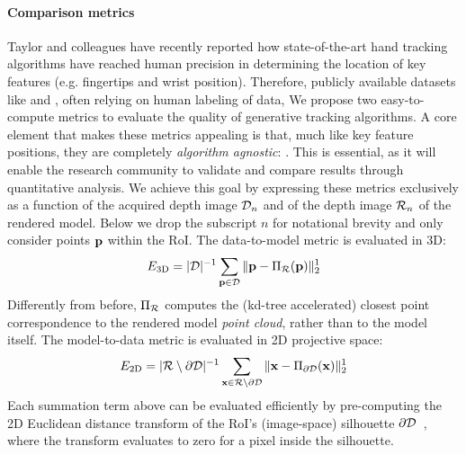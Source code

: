 
\paragraph{Comparison metrics}
Taylor and colleagues  have recently reported how state-of-the-art hand tracking algorithms have reached human precision in determining the location of key features (e.g. fingertips and wrist position). 
Therefore, publicly available datasets like \cite{tompson2014real} and \cite{sridhar2013multicam}, often relying on human labeling of data, 
% 
We propose two easy-to-compute metrics to evaluate the quality of generative tracking algorithms. A core element that makes these metrics appealing is that, much like key feature positions, they are completely \emph{algorithm agnostic}: . This is essential, as it will enable the research community to validate and compare results through quantitative analysis. 
% 
We achieve this goal by expressing these metrics exclusively as a function of the acquired depth image $\mathcal{D}_n$ and of the depth image $\mathcal{R}_{n}$ of the rendered model. 
Below we drop the subscript $n$ for notational brevity and only consider points  $\mathbf{p}$ within the RoI.
% 
The data-to-model metric is evaluated in 3D: 
% 
\begin{equation}
E_\text{3D} = |\mathcal{D}|^{-1} \sum_{\mathbf{p} \in \mathcal{D}} \| \mathbf{p} - \Pi_{\mathcal{R}}(\mathbf{p}) \|_2^1
\label{eq:metric1}
\end{equation}
% 
Differently from before, $\Pi_{\mathcal{R}}$ computes the (kd-tree accelerated) closest point correspondence to the rendered model \emph{point cloud}, rather than to the model itself. 
% 
The model-to-data metric is evaluated in 2D projective space:
% 
\begin{eqnarray}
E_\text{2D} = |\mathcal{R} \setminus \partial\mathcal{D}|^{-1} 
\sum_{\mathbf{x} \in \mathcal{R} \setminus \partial\mathcal{D}} \| \mathbf{x} - \Pi_{\partial\mathcal{D}}(\mathbf{x}) \|^1_2
\label{eq:metric2}
\end{eqnarray}
%
Each summation term above can be evaluated efficiently by pre-computing the 2D Euclidean distance transform of the RoI's (image-space) silhouette $\partial \mathcal{D}$~\cite{tagliasacchi2015robust}, where the transform evaluates to zero for a pixel inside the silhouette.
% 

